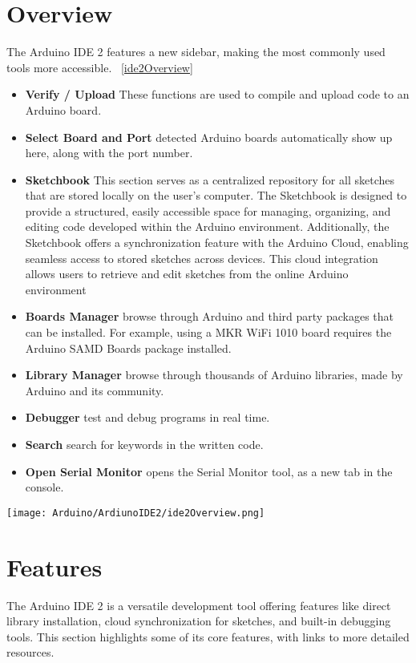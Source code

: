 \section{Overview}
The Arduino IDE 2 features a new sidebar, making the most commonly used tools more accessible. ~\ref{ide2Overview} \cite{arduinodescription:2024}

\begin{itemize}

    \item \textbf{Verify / Upload} These functions are used to compile and upload code to an Arduino board.
    \item \textbf{Select Board and Port} detected Arduino boards automatically show up here, along with the port number.
    \item \textbf{Sketchbook} This section serves as a centralized repository for all sketches that are stored locally on the user’s computer. The Sketchbook is designed to provide a structured, easily accessible space for managing, organizing, and editing code developed within the Arduino environment. Additionally, the Sketchbook offers a synchronization feature with the Arduino Cloud, enabling seamless access to stored sketches across devices. This cloud integration allows users to retrieve and edit sketches from the online Arduino environment
    \item \textbf{Boards Manager} browse through Arduino and third party packages that can be installed. For example, using a MKR WiFi 1010 board requires the Arduino SAMD Boards package installed.
    \item \textbf{Library Manager} browse through thousands of Arduino libraries, made by Arduino and its community.
    \item \textbf{Debugger} test and debug programs in real time.
    \item \textbf{Search} search for keywords in the written code.
    \item \textbf{Open Serial Monitor} opens the Serial Monitor tool, as a new tab in the console.
\end{itemize}


\begin{center}
        \texttt{[image: Arduino/ArdiunoIDE2/ide2Overview.png]}
        \label{ide2Overview}
\end{center}


\section{Features}
The Arduino IDE 2 is a versatile development tool offering features like direct library installation, cloud synchronization for sketches, and built-in debugging tools. This section highlights some of its core features, with links to more detailed resources.

